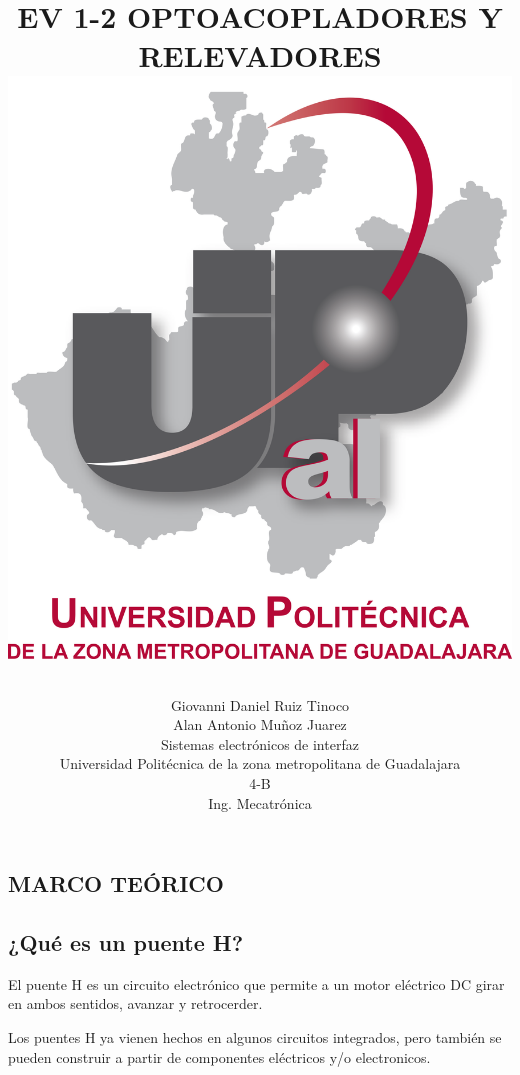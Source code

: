 \documentclass[12pt,a4paper]{article}
\title{EV 1-2 OPTOACOPLADORES Y RELEVADORES
\includegraphics [scale=1]{imagenes/UPZMG.png} 
\author{Giovanni Daniel Ruiz Tinoco\\
Alan Antonio Muñoz Juarez\\
\small Sistemas electrónicos de interfaz\\
  \small Universidad Politécnica de la zona metropolitana de Guadalajara\\
  \small 4-B \\
  \small Ing. Mecatrónica\\
\centering
}
}
\begin{document}
\maketitle
\newpage
\begin{center}
\section {MARCO TEÓRICO}
\end{center}
\subsection{¿Qué es un puente H?}
El puente H  es un circuito electrónico que permite a un motor eléctrico DC girar en ambos sentidos, avanzar y retrocerder.

Los puentes H ya vienen hechos en algunos circuitos integrados, pero también se pueden construir a partir de componentes eléctricos y/o electronicos.
\end{document}
